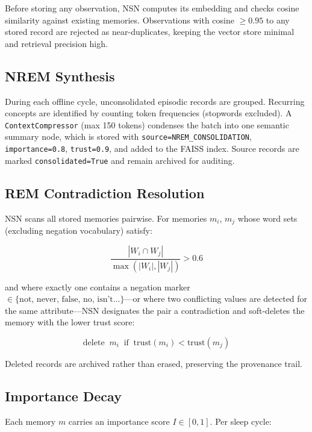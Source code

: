 \documentclass[conference]{IEEEtran}
\begin{document}
Before storing any observation, NSN computes its embedding and checks cosine
similarity against existing memories.  Observations with cosine $\geq 0.95$
to any stored record are rejected as near-duplicates, keeping the vector
store minimal and retrieval precision high.

\subsection{NREM Synthesis}

During each offline cycle, unconsolidated episodic records are grouped.
Recurring concepts are identified by counting token frequencies (stopwords
excluded).  A \texttt{ContextCompressor} (max 150 tokens) condenses the batch
into one semantic summary node, which is stored with
\texttt{source=NREM\_CONSOLIDATION}, \texttt{importance=0.8},
\texttt{trust=0.9}, and added to the FAISS index.  Source records are marked
\texttt{consolidated=True} and remain archived for auditing.

\subsection{REM Contradiction Resolution}

NSN scans all stored memories pairwise.  For memories $m_i$, $m_j$ whose
word sets (excluding negation vocabulary) satisfy:

\begin{equation}
\frac{|W_i \cap W_j|}{\max(|W_i|,|W_j|)} > 0.6
\label{eq:jaccard}
\end{equation}

and where exactly one contains a negation marker $\in\{\text{not, never,
false, no, isn't}\ldots\}$---or where two conflicting values are detected for
the same attribute---NSN designates the pair a contradiction and soft-deletes
the memory with the lower trust score:

\begin{equation}
\text{delete} \;\; m_i \;\; \text{if} \;\; \text{trust}(m_i) < \text{trust}(m_j)
\label{eq:rem}
\end{equation}

Deleted records are archived rather than erased, preserving the provenance trail.

\subsection{Importance Decay}

Each memory $m$ carries an importance score $I \in [0,1]$.  Per sleep cycle:
\end{document}
